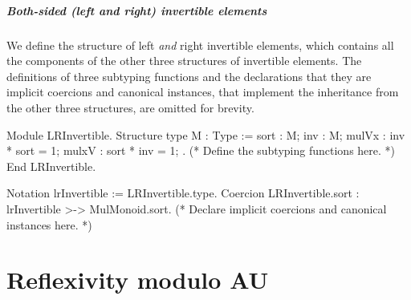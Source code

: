 \documentclass[a4paper,UKenglish,cleveref,autoref]{lipics-v2021}
\newcommand\conveq{\equiv}
\newcommand\unify{\ensuremath{\mathrel{\hat{\conveq}}}}
\newcommand\evar[1]{\ensuremath{?_{\texttt{#1}}}}
\begin{document}
\subparagraph{Both-sided (left and right) invertible elements}
We define the structure of left \emph{and} right invertible elements, which contains all the
components of the other three structures of invertible elements.
The definitions of three subtyping functions and the declarations that they are implicit coercions
and canonical instances, that implement the inheritance from the other three structures, are omitted
for brevity.
\begin{rocqcode}
Module LRInvertible.
Structure type M : Type :=
  { sort : M; inv : M; mulVx : inv * sort = 1; mulxV : sort * inv = 1; }.
(* Define the subtyping functions here. *)
End LRInvertible.

Notation lrInvertible := LRInvertible.type.
Coercion LRInvertible.sort : lrInvertible >-> MulMonoid.sort.
(* Declare implicit coercions and canonical instances here. *)
\end{rocqcode}


\section{Reflexivity modulo AU}
\label{sec:areflexivity}
\end{document}
